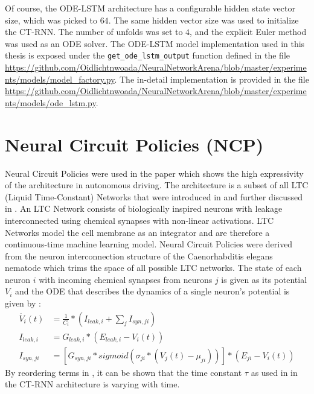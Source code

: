 \documentclass[draft,final]{vutinfth} %
\begin{document}
    Of course, the ODE-LSTM architecture has a configurable hidden state vector size, which was picked to $64$.
    The same hidden vector size was used to initialize the CT-RNN. The number of unfolds was set to $4$, and the explicit Euler method was used as an ODE solver.
    The ODE-LSTM model implementation used in this thesis is exposed under the \texttt{get\_ode\_lstm\_output} function defined in the file \url{https://github.com/Oidlichtnwoada/NeuralNetworkArena/blob/master/experiments/models/model_factory.py}.
    The in-detail implementation is provided in the file \url{https://github.com/Oidlichtnwoada/NeuralNetworkArena/blob/master/experiments/models/ode_lstm.py}.


    \section{Neural Circuit Policies (NCP)} \label{ncp}
    Neural Circuit Policies were used in the paper \cite{NCP} which shows the high expressivity of the architecture in autonomous driving.
    The architecture is a subset of all LTC (Liquid Time-Constant) Networks that were introduced in \cite{LTCFormulas} and further discussed in \cite{LTCNetworks}.
    An LTC Network consists of biologically inspired neurons with leakage interconnected using chemical synapses with non-linear activations.
    LTC Networks model the cell membrane as an integrator and are therefore a continuous-time machine learning model.
    Neural Circuit Policies were derived from the neuron interconnection structure of the Caenorhabditis elegans nematode \cite[p. 3]{NCP} which trims the space of all possible LTC networks.
    The state of each neuron $i$ with incoming chemical synapses from neurons $j$ is given as its potential $V_i$ and the ODE that describes the dynamics of a single neuron's potential is given by \cite[p. 1-2]{LTCFormulas}:
    \begin{align}
        \label{ltc_formula}
        \dot{V_i}(t) &= \frac{1}{C_i} * (I_{leak,i} + \sum_j{I_{syn,ji}}) \\
        \label{leakage_current}
        I_{leak,i} &= G_{leak,i} * (E_{leak,i} - V_i(t)) \\
        \label{synaptic_current}
        I_{syn,ji} &= [G_{syn,ji} * sigmoid(\sigma_{ji}*(V_j(t)-\mu_{ji}))] * (E_{ji} - V_i(t))
    \end{align}
    By reordering terms in , it can be shown that the time constant $\tau$ as used in  in the CT-RNN architecture is varying with time.
\end{document}
